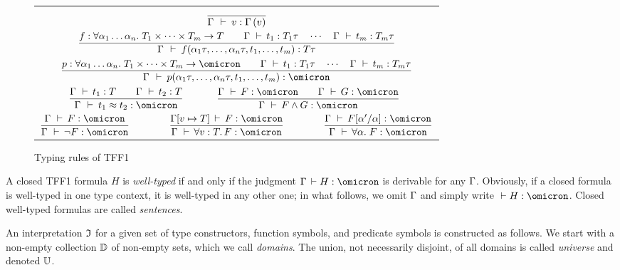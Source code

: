 \begin{figure}
\begin{center}
\begin{tabular}{c@{\qquad\qquad}c}
\multicolumn{2}{c}{$\displaystyle
\frac{}{\mathrm{\Gamma}\, \:\vdash\: v \mathrel{:} \mathrm{\Gamma}\,(v)}$} \\[4ex]
\multicolumn{2}{c}{$\displaystyle
\frac{f \mathrel{:} \forall \alpha_1\dots\alpha_n .\;
    T_1 \times \dots \times T_m \to T
\qquad
\mathrm{\Gamma}\, \,\vdash\, t_1 \mathrel{:} T_1\tau
\quad\cdots\quad
\mathrm{\Gamma}\, \,\vdash\, t_m \mathrel{:} T_m\tau
}{\mathrm{\Gamma}\, \:\vdash\:
f(\alpha_1\tau,\dots,\alpha_n\tau,t_1,\dots,t_m) \mathrel{:} T\tau}
$} \\[4ex]
\multicolumn{2}{c}{$\displaystyle
\frac{p \ty \forall \alpha_1\dots\alpha_n .\;
    T_1 \times \dots \times T_m \to \omicron
\qquad
\GAM\, \,\vdash\, t_1 \ty T_1\tau
\quad\cdots\quad
\GAM\, \,\vdash\, t_m \ty T_m\tau
}{\GAM\, \:\vdash\:
p(\alpha_1\tau,\dots,\alpha_n\tau,t_1,\dots,t_m) \ty \omicron}
$} \\[4ex]
$\qquad\displaystyle
\frac{\GAM\, \,\vdash\, t_1 \ty T \qquad \GAM\, \,\vdash\, t_2 \ty T}{
\GAM\, \:\vdash\: t_1 \eq t_2 \ty \omicron}$ &
$\displaystyle
\frac{\GAM\, \,\vdash\, F \ty \omicron \qquad
\GAM\, \,\vdash\, G \ty \omicron}{
\GAM\, \,\vdash\, F \land G \ty \omicron}\qquad$ \\[4ex]
\multicolumn{2}{c}{
$\displaystyle
\frac{\GAM\, \,\vdash\, F \ty \omicron}{
\GAM\, \,\vdash\, \lnot F \ty \omicron}\qquad\qquad
\frac{\GAM[v \mapsto T] \,\vdash\, F \ty \omicron}{
\GAM\, \,\vdash\, \forall v \ty T .\, F \ty \omicron}\qquad\qquad
\frac{\GAM\, \,\vdash\, F[\alpha'/\alpha] \ty \omicron}{
\GAM\, \,\vdash\, \forall \alpha .\; F \ty \omicron}$}
\end{tabular}
\end{center}
\caption{Typing rules of TFF1}
\label{fig:typing}
\end{figure}

A closed TFF1 formula $H$ is {\em well-typed\/} if and only if
the judgment $\GAM\, \vdash H \ty \omicron$ is derivable
for any $\mathrm{\Gamma}$.
Obviously, if a closed formula is
well-typed in one type context, it is well-typed in any other one;
in what follows, we omit $\mathrm{\Gamma}$ and simply write
${} \vdash H \ty \omicron$.
Closed well-typed formulas are called {\em sentences}.

An interpretation $\mathfrak{I}$ for a given set of type constructors,
function symbols, and predicate symbols is constructed as follows.
We start with a non-empty collection $\mathbb{D}$ of non-empty sets,
which we call {\em domains}. The union, not necessarily disjoint,
of all domains is called {\em universe\/} and denoted $\mathbb{U}$.

